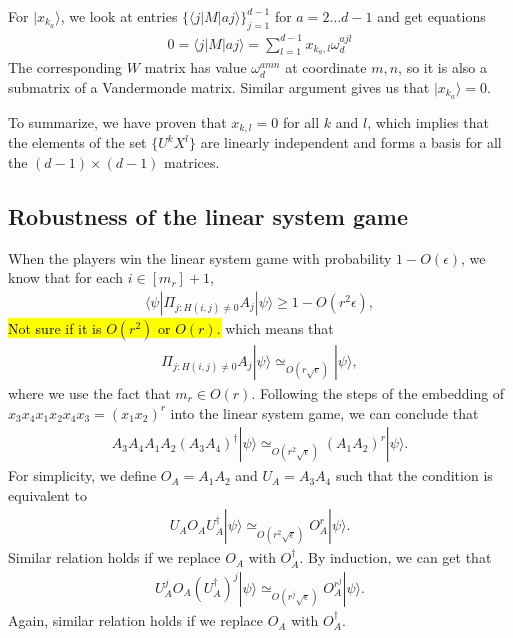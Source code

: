 \documentclass[11pt,letterpaper]{article}
\newcommand{\ket}[1]{|#1\rangle}
\newcommand{\bra}[1]{\langle#1|}
\newcommand{\ct}{^{\dagger}}
\newcommand{\1}{\mathbb{1}}
\newcommand{\se}{\sqrt{\epsilon}}
\newcommand{\appd}[1]{\simeq_{#1}}
\theoremstyle{definition}
\begin{document}
For $\ket{x_{k_a}}$, we look at entries $\{\bra{j}M\ket{aj}\}_{j=1}^{d-1}$ for $a = 2 \dots d-1$ and get equations
\begin{align}
	0 = \bra{j}M\ket{aj} = \sum_{l=1}^{d-1} x_{k_a, l} \omega_d^{ajl} 
\end{align}
The corresponding $W$ matrix has value $\omega_d^{amn}$ at coordinate $m,n$,
so it is also a submatrix of a Vandermonde matrix. Similar argument gives us that $\ket{x_{k_a}} = 0$.

To summarize, we have proven that $x_{k,l} = 0$ for all $k$ and $l$, which implies that the elements of the set
$\{ U^k X^l \}$ are linearly independent and forms a basis for all the $(d-1)\times(d-1)$ matrices.
\subsection{Robustness of the linear system game}
When the players win the linear system game with probability $1-O(\epsilon)$,
we know that for each $i \in [m_r]+1$,
\begin{align}
\bra{\psi} \Pi_{j:H(i,j) \neq 0} A_j \ket{\psi} \geq 1- O(r^2 \epsilon),
\end{align}
\hl{Not sure if it is $O(r^2)$ or $O(r)$.}
which means that 
\begin{align}
	\Pi_{j:H(i,j) \neq 0} A_j \ket{\psi} \appd{O(r \se)} \ket{\psi},
\end{align}
where we use the fact that $m_r \in O(r)$.
Following the steps of the embedding of $x_3x_4x_1x_2x_4x_3 = (x_1x_2)^r$ into the linear system game,
we can conclude that 
\begin{align}
	A_3A_4 A_1A_2 (A_3A_4)^\dagger \ket{\psi}\appd{O(r^2 \se)} (A_1A_2)^r \ket{\psi}.
\end{align}
For simplicity, we define $O_A = A_1A_2$ and $U_A=A_3A_4$ such that
the condition is equivalent to
\begin{align}
	\label{eq:ux_relation}
	U_AO_AU_A\ct \ket{\psi} \appd{O(r^2 \se)} O_A^r \ket{\psi}.
\end{align}
Similar relation holds if we replace $O_A$ with $O_A\ct$.
By induction, we can get that 
\begin{align}
	U_A^j O_A (U_A\ct)^j \ket{\psi} \appd{O(r^j \se)} O_A^{r^j} \ket{\psi}.
\end{align}
Again, similar relation holds if we replace $O_A$ with $O_A\ct$.
\end{document}
